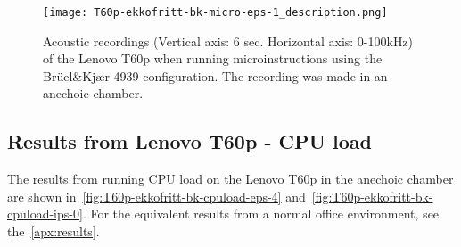 \begin{figure}[ht]
    \centering
    \texttt{[image: T60p-ekkofritt-bk-micro-eps-1\_description.png]}
    \caption{Acoustic recordings (Vertical axis: 6 sec. Horizontal axis: 0-100kHz) of the Lenovo T60p when running microinstructions using the Brüel\&Kjær 4939 configuration. The recording was made in an anechoic chamber.}
    \label{fig:T60p-ekkofritt-bk-micro-eps-1}
\end{figure}


\subsection{Results from Lenovo T60p - CPU load}\label{chp5:subsec:t60p_bk_results_cpuload}
The results from running CPU load on the Lenovo T60p in the anechoic chamber are shown in~\autoref{fig:T60p-ekkofritt-bk-cpuload-eps-4} and~\autoref{fig:T60p-ekkofritt-bk-cpuload-ips-0}. For the equivalent results from a normal office environment, see the~\autoref{apx:results}.

